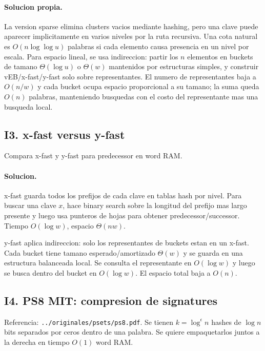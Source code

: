 \documentclass[10pt]{article}
\newcommand{\bigO}{O}
\begin{document}
\paragraph{Solucion propia.}
La version sparse elimina clusters vacios mediante hashing, pero una clave puede
aparecer implicitamente en varios niveles por la ruta recursiva. Una cota natural
es $\bigO(n\log\log u)$ palabras si cada elemento causa presencia en un nivel
por escala. Para espacio lineal, se usa indireccion: partir los $n$ elementos en
buckets de tamano $\Theta(\log u)$ o $\Theta(w)$ mantenidos por estructuras
simples, y construir vEB/x-fast/y-fast solo sobre representantes. El numero de
representantes baja a $\bigO(n/w)$ y cada bucket ocupa espacio proporcional a su
tamano; la suma queda $\bigO(n)$ palabras, manteniendo busquedas con el costo
del representante mas una busqueda local.

\subsection*{I3. x-fast versus y-fast}
Compara x-fast y y-fast para predecessor en word RAM.

\paragraph{Solucion.}
x-fast guarda todos los prefijos de cada clave en tablas hash por nivel. Para
buscar una clave $x$, hace binary search sobre la longitud del prefijo mas largo
presente y luego usa punteros de hojas para obtener predecessor/successor.
Tiempo $\bigO(\log w)$, espacio $\Theta(nw)$.

y-fast aplica indireccion: solo los representantes de buckets estan en un
x-fast. Cada bucket tiene tamano esperado/amortizado $\Theta(w)$ y se guarda en
una estructura balanceada local. Se consulta el representante en $\bigO(\log w)$
y luego se busca dentro del bucket en $\bigO(\log w)$. El espacio total baja a
$\bigO(n)$.

\subsection*{I4. PS8 MIT: compresion de signatures}
Referencia: \texttt{../originales/psets/ps8.pdf}. Se tienen $k=\log^\epsilon n$
hashes de $\log n$ bits separados por ceros dentro de una palabra. Se quiere
empaquetarlos juntos a la derecha en tiempo $\bigO(1)$ word RAM.
\end{document}
